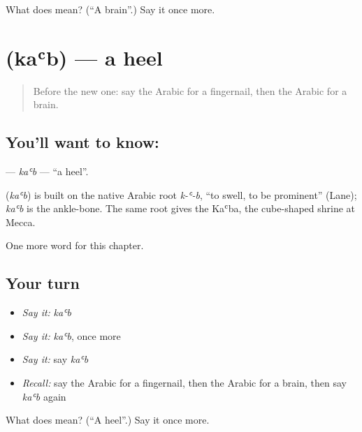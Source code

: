 \begin{tcolorbox}[breakable,colback=teal!4,colframe=teal!35!black,title={Before you move on}]
What does  mean? (\textquotedblleft{}A brain\textquotedblright{}.) Say it once more.
\end{tcolorbox}
\section[\texorpdfstring{\ar{كعب} (kaʿb)}{كعب (kaʿb)}]{ (kaʿb) — a heel}

\label{lesson:AR-C140-kab}



\begin{quote}
Before the new one: say the Arabic for a fingernail, then the Arabic for a brain.
\end{quote}

\subsection*{You'll want to know: }
\textbf{} — \emph{kaʿb} — \textquotedblleft{}a heel\textquotedblright{}.

\begin{cousinweb}
\textbf{} (\emph{kaʿb}) is built on the native Arabic root \emph{k-ʿ-b}, \textquotedblleft{}to swell, to be prominent\textquotedblright{} (Lane); \emph{kaʿb} is the ankle-bone. The same root gives the Kaʿba, the cube-shaped shrine at Mecca.
\end{cousinweb}

\begin{grammarlens}[title={What you've built}]
One more word for this chapter.
\end{grammarlens}

\subsection*{Your turn}
\begin{itemize}
\raggedright
  \item \emph{Say it:} \emph{kaʿb}
  \item \emph{Say it:} \emph{kaʿb}, once more
  \item \emph{Say it:} say \emph{kaʿb}
  \item \emph{Recall:} say the Arabic for a fingernail, then the Arabic for a brain, then say \emph{kaʿb} again
\end{itemize}

\begin{tcolorbox}[breakable,colback=teal!4,colframe=teal!35!black,title={Before you move on}]
What does  mean? (\textquotedblleft{}A heel\textquotedblright{}.) Say it once more.
\end{tcolorbox}
